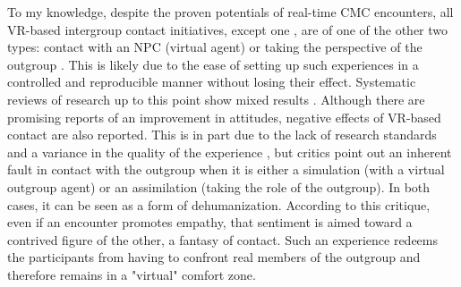 \documentclass[dissertation,math,vertlayout,pdfa,colorlinks]{aaltoseries}
\begin{document}
To my knowledge, despite the proven potentials of real-time CMC encounters, all VR-based intergroup contact initiatives, except one \cite{tassinariInvestigatingInfluenceIntergroup2022}, are of one of the other two types: contact with an NPC (virtual agent) or taking the perspective of the outgroup \cite{chenFuturePrejudiceReduction2024, tassinariUseVirtualReality2021}. This is likely due to the ease of setting up such experiences in a controlled and reproducible manner without losing their effect. Systematic reviews of research up to this point show mixed results \cite{chenFuturePrejudiceReduction2024, tassinariUseVirtualReality2021}. Although there are promising reports of an improvement in attitudes, negative effects of VR-based contact are also reported. This is in part due to the lack of research standards and a variance in the quality of the experience \cite{tassinariUseVirtualReality2021}, but critics \cite{messeriLandUnrealVirtual2024, nashVirtualRealityWitness2018, bollmerEmpathyMachines2017} point out an inherent fault in contact with the outgroup when it is either a simulation (with a virtual outgroup agent) or an assimilation (taking the role of the outgroup). In both cases, it can be seen as a form of dehumanization. According to this critique, even if an encounter promotes empathy, that sentiment is aimed toward a contrived figure of the other, a fantasy of contact. Such an experience redeems the participants from having to confront real members of the outgroup and therefore remains in a "virtual" comfort zone. 
\end{document}
